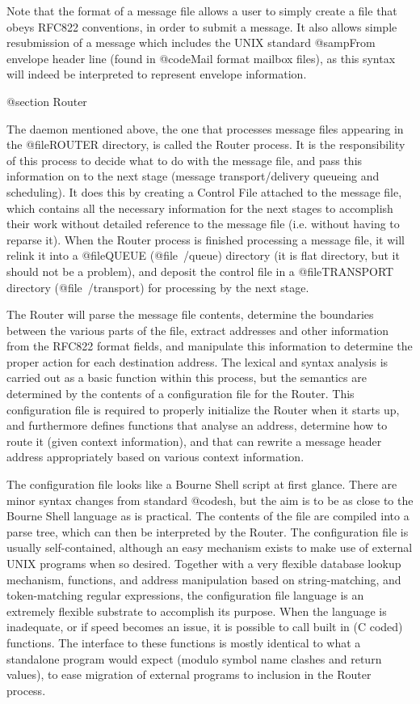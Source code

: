 Note that the format of a message file allows a user to simply
create a file that obeys RFC822 conventions, in order to submit
a message.
It also allows simple resubmission of a message which includes
the UNIX standard @samp{From } envelope header line (found in
@code{Mail} format mailbox files), as this syntax will indeed
be interpreted to represent envelope information.

@section Router

The daemon mentioned above, the one that processes message
files appearing in the @file{ROUTER} directory, is called
the Router process.
It is the responsibility of this process to decide what to
do with the message file, and pass this information on to
the next stage (message transport/delivery queueing and scheduling).
It does this by creating a Control File attached to the message
file, which contains all the necessary information for the next
stages to accomplish their work without detailed reference to
the message file (i.e.  without having to reparse it).
When the Router process is finished processing a message file,
it will relink it into a @file{QUEUE} (@file{~/queue}) directory
(it is flat directory, but it should not be a problem), and deposit
the control file in a @file{TRANSPORT} directory (@file{~/transport})
for processing by the next stage.

The Router will parse the message file contents, determine
the boundaries between the various parts of the file, extract
addresses and other information from the RFC822 format fields,
and manipulate this information to determine the proper action
for each destination address.
The lexical and syntax analysis is carried out as a basic function
within this process, but the semantics are determined by the
contents of a configuration file for the Router.
This configuration file is required to properly initialize the
Router when it starts up, and furthermore defines functions that
analyse an address, determine how to route it (given context
information), and that can rewrite a message header address
appropriately based on various context information.

The configuration file looks like a Bourne Shell script at first glance.
There are minor syntax changes from standard @code{sh}, but the aim
is to be as close to the Bourne Shell language as is practical.
The contents of the file are compiled into a parse tree, which
can then be interpreted by the Router.
The configuration file is usually self-contained, although an easy
mechanism exists to make use of external UNIX programs when so desired.
Together with a very flexible database lookup mechanism, functions,
and address manipulation based on string-matching, and token-matching
regular expressions, the configuration file language is an extremely
flexible substrate to accomplish its purpose.
When the language is inadequate, or if speed becomes an issue,
it is possible to call built in (C coded) functions.
The interface to these functions is mostly identical to what
a standalone program would expect (modulo symbol name clashes
and return values), to ease migration of external programs to
inclusion in the Router process.

